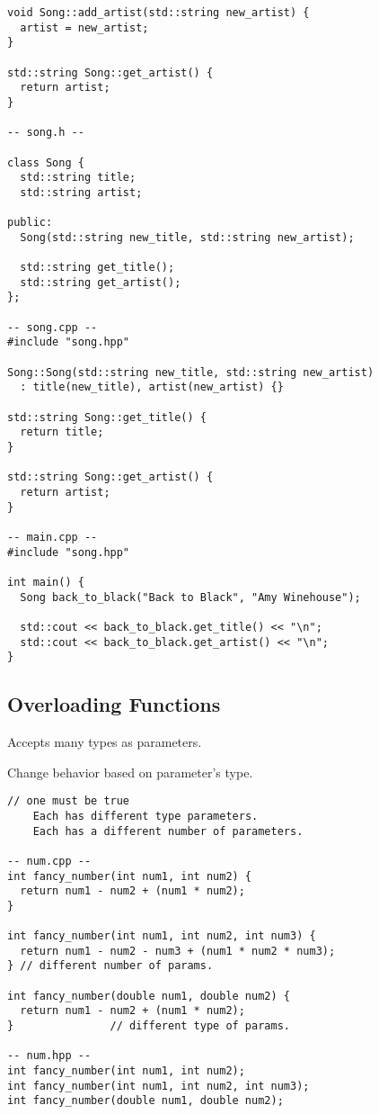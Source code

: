 \documentclass[openany]{report}
\begin{document}
\begin{verbatim}
void Song::add_artist(std::string new_artist) {
  artist = new_artist;
}

std::string Song::get_artist() {
  return artist;
}

-- song.h --

class Song {
  std::string title;
  std::string artist;

public:
  Song(std::string new_title, std::string new_artist);

  std::string get_title();
  std::string get_artist();
};

-- song.cpp --
#include "song.hpp"

Song::Song(std::string new_title, std::string new_artist)
  : title(new_title), artist(new_artist) {}

std::string Song::get_title() {
  return title;
}

std::string Song::get_artist() {
  return artist;
}

-- main.cpp --
#include "song.hpp"

int main() { 
  Song back_to_black("Back to Black", "Amy Winehouse");

  std::cout << back_to_black.get_title() << "\n";
  std::cout << back_to_black.get_artist() << "\n";
}
\end{verbatim}

\subsection{Overloading Functions}

Accepts many types as parameters.

Change behavior based on parameter's type.

\begin{verbatim}
// one must be true
    Each has different type parameters.
    Each has a different number of parameters.
    
-- num.cpp --
int fancy_number(int num1, int num2) {
  return num1 - num2 + (num1 * num2);
}

int fancy_number(int num1, int num2, int num3) {
  return num1 - num2 - num3 + (num1 * num2 * num3);
} // different number of params.

int fancy_number(double num1, double num2) {
  return num1 - num2 + (num1 * num2);
}               // different type of params.

-- num.hpp --
int fancy_number(int num1, int num2);
int fancy_number(int num1, int num2, int num3);
int fancy_number(double num1, double num2);
\end{verbatim}
\end{document}
